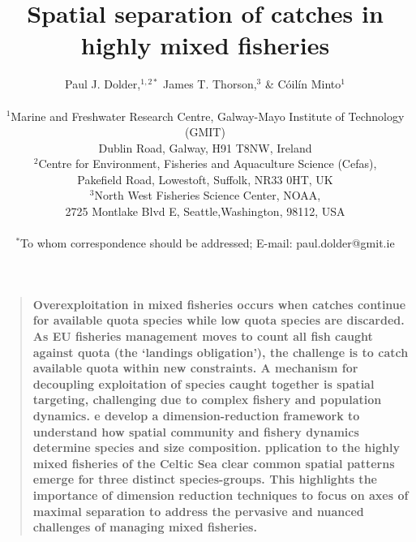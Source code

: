 \documentclass[12pt]{article}
\title{Spatial separation of catches in highly mixed fisheries}
\author
{Paul J. Dolder,$^{1,2\ast}$ James T. Thorson,$^3$ \& Cóilín Minto$^1$\\
\\
\normalsize{$^1$Marine and Freshwater Research Centre, Galway-Mayo Institute of
	Technology (GMIT)}\\
\normalsize{Dublin Road, Galway, H91 T8NW, Ireland}\\
\normalsize{$^2$Centre for Environment, Fisheries and Aquaculture Science
	(Cefas),}\\
\normalsize{Pakefield Road, Lowestoft, Suffolk, NR33 0HT, UK}\\
\normalsize{$^3$North West Fisheries Science Center, NOAA,}\\
\normalsize{2725 Montlake Blvd E, Seattle,Washington, 98112, USA}\\
\\
\normalsize{$^\ast$To whom correspondence should be addressed; E-mail:
	paul.dolder@gmit.ie}
}
\date{}
\newenvironment{sciabstract}{%
\begin{quote} \bf}
{\end{quote}}
\begin{document}
\baselineskip24pt

\maketitle

\begin{linenumbers}

\begin{sciabstract}
	Overexploitation in mixed fisheries occurs when
catches continue for available quota species while low quota species are
discarded. As EU fisheries management moves to count all fish
caught against quota (the `landings obligation'), the challenge is to catch
available quota within new constraints.
A mechanism for decoupling exploitation of species caught together is spatial
targeting,  challenging due to
complex  fishery and population
dynamics.%
e develop a dimension-reduction framework to understand how
spatial community and fishery dynamics determine species and size
composition.  
pplication to the highly mixed fisheries of
the Celtic Sea  clear common spatial patterns
emerge for three distinct species-groups.
This highlights the importance of dimension reduction techniques to focus
on axes of maximal
 separation to address the pervasive and nuanced challenges of managing mixed
fisheries.  
\end{sciabstract}


\end{linenumbers}
\end{document}
